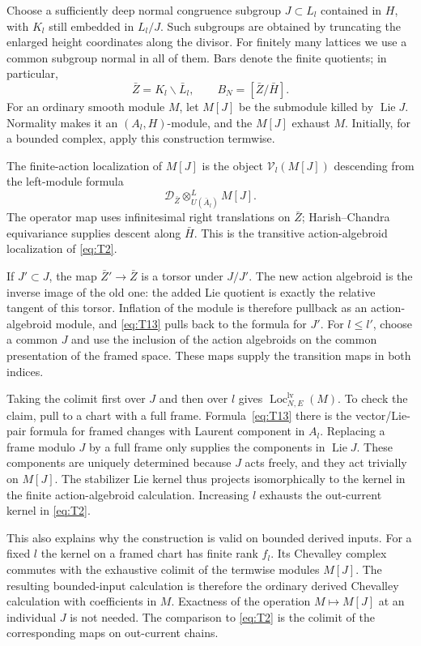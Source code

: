 \documentclass[11pt]{article}
\numberwithin{equation}{section}
\theoremstyle{definition}
\theoremstyle{remark}
\begin{document}
Choose a sufficiently deep normal congruence subgroup $J\subset L_l$
contained in $H$, with $K_l$ still embedded in $L_l/J$.  Such
subgroups are obtained by truncating the enlarged height coordinates
along the divisor.  For finitely many lattices we use a common
subgroup normal in all of them.  Bars denote the finite quotients;
in particular,
\[
 \bar Z=K_l\backslash\bar L_l,
 \qquad B_N=[\bar Z/\bar H].
\]
For an ordinary smooth module $M$, let $M[J]$ be the submodule killed
by $\operatorname{Lie}J$.  Normality makes it an
$(A_l,H)$-module, and the $M[J]$ exhaust $M$.  Initially, for a bounded
complex, apply this construction termwise.

The finite-action localization of $M[J]$ is the object
$\mathcal V_l(M[J])$ descending from the left-module formula
\begin{equation}\label{eq:T13}
 \mathscr D_{\bar Z}\otimes^L_{U(\bar A_l)}M[J].
\end{equation}
The operator map uses infinitesimal right translations on $\bar Z$;
Harish--Chandra equivariance supplies descent along $\bar H$.
This is the transitive action-algebroid localization of
\eqref{eq:T2}.

If $J'\subset J$, the map $\bar Z'\to\bar Z$ is a torsor under
$J/J'$.  The new action algebroid is the inverse image of the old
one: the added Lie quotient is exactly the relative tangent of this
torsor.  Inflation of the module is therefore pullback as an
action-algebroid module, and \eqref{eq:T13} pulls back to the formula
for $J'$.  For $l\leq l'$, choose a common $J$ and use the inclusion
of the action algebroids on the common presentation of the framed
space.  These maps supply the transition maps in both indices.

Taking the colimit first over $J$ and then over $l$ gives
$\operatorname{Loc}_{N,E}^{\mathrm{lv}}(M)$.  To check the claim,
pull to a chart with a full frame.  Formula~\eqref{eq:T13} there is
the vector/Lie-pair formula for framed changes with Laurent component
in $A_l$.  Replacing a frame modulo $J$ by a full frame only supplies
the components in $\operatorname{Lie}J$.  These components are
uniquely determined because $J$ acts freely, and they act trivially
on $M[J]$.  The stabilizer Lie kernel thus projects isomorphically to
the kernel in the finite action-algebroid calculation.  Increasing
$l$ exhausts the out-current kernel in \eqref{eq:T2}.

This also explains why the construction is valid on bounded derived
inputs.  For a fixed $l$ the kernel on a framed chart has finite rank
$f_l$.  Its Chevalley complex commutes with the exhaustive colimit
of the termwise modules $M[J]$.  The resulting bounded-input
calculation is therefore the ordinary derived Chevalley calculation
with coefficients in $M$.  Exactness of the operation $M\mapsto
M[J]$ at an individual $J$ is not needed.  The comparison to
\eqref{eq:T2} is the colimit of the corresponding maps on out-current
chains.
\end{document}
